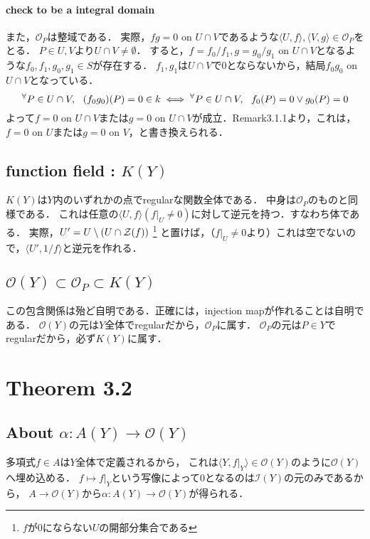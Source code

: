 \documentclass[a4paper]{jarticle}
\begin{document}
    \paragraph{check to be a integral domain}
    また，$\mathcal{O}_P$は整域である．
    実際，$fg=0$ on $U \cap V$であるような$\langle U,f \rangle, \langle V,g \rangle \in \mathcal{O}_P$をとる．
    $P \in U, V$より$U \cap V \neq \emptyset$．
    すると，$f=f_0 / f_1, g=g_0 / g_1$ on $U \cap V$となるような$f_0, f_1, g_0, g_1 \in S$が存在する．
    $f_1, g_1$は$U \cap V$で0とならないから，結局$f_0 g_0$ on $U \cap V$となっている．
    \[ {}^{\forall} P \in U \cap V,~~ (f_0 g_0)(P)=0 \in k  \iff {}^{\forall} P \in U \cap V,~~ f_0(P)=0 \lor g_0(P)=0\]
    よって$f=0$ on $U \cap V$または$g=0$ on $U \cap V$が成立．Remark3.1.1より，これは，$f=0$ on $U$または$g=0$ on $V$，と書き換えられる．

    \subsection{function field : $K(Y)$}
    $K(Y)$は$Y$内のいずれかの点でregularな関数全体である．
    中身は$\mathcal{O}_P$のものと同様である．
    これは任意の$\langle U,f \rangle (f|_{U} \neq 0)$に対して逆元を持つ．すなわち体である．
    実際，$U'=U \setminus (U \cap \mathcal{Z}(f))$
    \footnote{$f$が0にならない$U$の開部分集合である}
    と置けば，（$f|_{U} \neq 0$より）これは空でないので，$\langle U',1/f\rangle$と逆元を作れる．

    \subsection{$\mathcal{O}(Y) \subset \mathcal{O}_P \subset K(Y)$}
    この包含関係は殆ど自明である．正確には，injection mapが作れることは自明である．
    $\mathcal{O}(Y)$の元は$Y$全体でregularだから，$\mathcal{O}_P$に属す．
    $\mathcal{O}_P$の元は$P \in Y$でregularだから，必ず$K(Y)$に属す．

\section{Theorem 3.2}
    \subsection{About $\alpha: A(Y) \to \mathcal{O}(Y)$}
    多項式$f \in A$は$Y$全体で定義されるから，
    これは$\langle Y, f|_{Y} \rangle \in \mathcal{O}(Y)$のように$\mathcal{O}(Y)$へ埋め込める．
    $f \mapsto f|_{Y}$という写像によって0となるのは$\mathcal{I}(Y)$の元のみであるから，
    $A \to \mathcal{O}(Y)$から$\alpha: A(Y) \to \mathcal{O}(Y)$が得られる．
\end{document}
